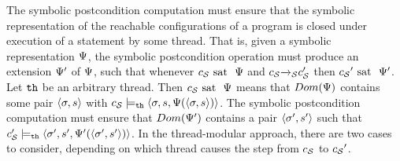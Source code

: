 The symbolic postcondition computation must ensure that the symbolic
representation
of the reachable configurations of a program is closed under execution of a
statement by some thread. That is,
given a symbolic representation $\Psi$,
the symbolic postcondition operation must produce an extension $\Psi'$
of $\Psi$, such that whenever $c_{\mathcal S} \mbox{ sat \ } \Psi$
and $c_{\mathcal S}{\xrightarrow{}{}}_{\!\!{\mathcal S}}c_{\mathcal S}'$ then
${c_{\mathcal S}}' \mbox{ sat \ } \Psi'$.
Let ${\tt th}$ be an arbitrary thread. Then $c_{\mathcal S} \mbox{ sat \ } \Psi$
means that $Dom(\Psi)$ contains some
pair $\left\langle\sigma,s\right\rangle$ with
$c_{\mathcal S} \models_{{\tt th}} \left\langle\sigma,s,\Psi(\left\langle\sigma,s\right\rangle)\right\rangle$.
The symbolic postcondition computation must ensure that
$Dom(\Psi')$ contains a pair
$\left\langle\sigma',s'\right\rangle$ such that
$c_{\mathcal S}' \models_{{\tt th}} \left\langle\sigma',s',\Psi'(\left\langle\sigma',s'\right\rangle)\right\rangle$.
In the thread-modular approach, there are two cases to consider, depending
on which thread causes the step from $c_{\mathcal S}$ to ${c_{\mathcal S}}'$.
